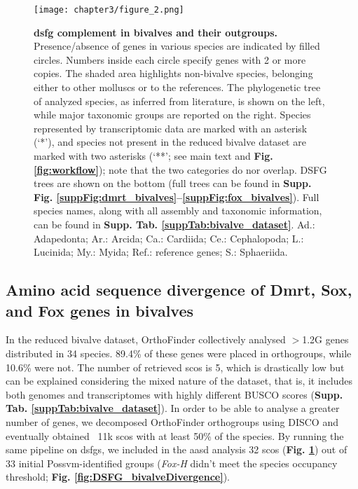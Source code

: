 \documentclass[../main.tex]{subfiles}
\begin{document}
\begin{figure}
	\centering
	\texttt{[image: chapter3/figure\_2.png]}
	\captionsetup{width=\textwidth}
	\caption{
		\textbf{\gls{dsfg} complement in bivalves and their outgroups.} Presence/absence of genes in various species are indicated by filled circles. Numbers inside each circle specify genes with 2 or more copies. The shaded area highlights non-bivalve species, belonging either to other molluscs or to the references. The phylogenetic tree of analyzed species, as inferred from literature, is shown on the left, while major taxonomic groups are reported on the right. Species represented by transcriptomic data are marked with an asterisk (‘*’), and species not present in the reduced bivalve dataset are marked with two asterisks (‘**’; see main text and \textbf{Fig. \ref{fig:workflow}}); note that the two categories do nor overlap. DSFG trees are shown on the bottom (full trees can be found in \textbf{Supp. Fig. \ref{suppFig:dmrt_bivalves}--\ref{suppFig:fox_bivalves}}). Full species names, along with all assembly and taxonomic information, can be found in \textbf{Supp. Tab. \ref{suppTab:bivalve_dataset}}.  Ad.: Adapedonta; Ar.: Arcida; Ca.: Cardiida; Ce.: Cephalopoda; L.: Lucinida; My.: Myida; Ref.: reference genes; S.: Sphaeriida.
	}
	\label{fig:DSFG_bivalveCompilation}
\end{figure}

\subsection{Amino acid sequence divergence of Dmrt, Sox, and Fox genes in bivalves}
In the reduced bivalve dataset, OrthoFinder collectively analysed $>$1.2G genes distributed in 34 species. 89.4\% of these genes were placed in orthogroups, while 10.6\% were not. The number of retrieved \glspl{sco} is 5, which is drastically low but can be explained considering the mixed nature of the dataset, that is, it includes both genomes and transcriptomes with highly different BUSCO scores (\textbf{Supp. Tab. \ref{suppTab:bivalve_dataset}}). In order to be able to analyse a greater number of genes, we decomposed OrthoFinder orthogroups using DISCO and eventually obtained ~11k \glspl{sco} with at least 50\% of the species. By running the same pipeline on \glspl{dsfg}, we included in the \gls{aasd} analysis 32 \glspl{sco} (\textbf{Fig. \ref{fig:DSFG_bivalveCompilation}}) out of 33 initial Possvm-identified groups (\textit{Fox-H} didn’t meet the species occupancy threshold; \textbf{Fig. \ref{fig:DSFG_bivalveDivergence}}).
\end{document}
